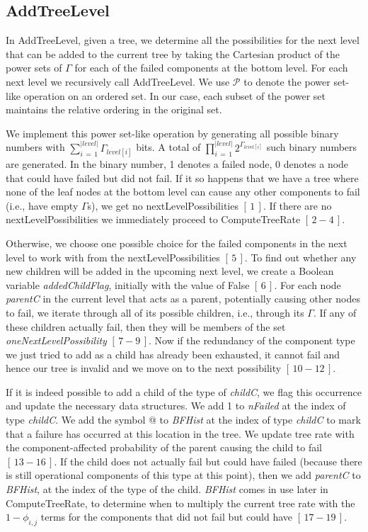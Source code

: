 \documentclass[12pt]{article}
\newcommand{\citeLine}[1]{$[\,#1\,]$}
\newcommand{\citeBlock}[2]{$[\,#1 - #2\,]$}
\begin{document}
\subsection{AddTreeLevel}

 In AddTreeLevel, given a tree, we determine all the possibilities for the next level that can be added to the current tree by taking the Cartesian product of the power sets of $\Gamma$ for each of the failed components at the bottom level. For each next level we recursively call AddTreeLevel. We use $\mathcal{P}$ to denote the power set-like operation on an ordered set. In our case, each subset of the power set maintains the relative ordering in the original set.

 We implement this power set-like operation by generating all possible binary numbers with $\sum\limits_{i\,=\,1}^{|level|}\Gamma_{level[i]}$ bits. A total of $\prod\limits_{i\,=\,1}^{|level|}2^{\Gamma_{level[i]}}$ such binary numbers are generated. In the binary number, 1 denotes a failed node, 0 denotes a node that could have failed but did not fail. If it so happens that we have a tree where none of the leaf nodes at the bottom level can cause any other components to fail (i.e., have empty $\Gamma$s), we get no nextLevelPossibilities \citeLine{1}. If there are no nextLevelPossibilities we immediately proceed to ComputeTreeRate \citeBlock{2}{4}.

 Otherwise, we choose one possible choice for the failed components in the next level to work with from the nextLevelPossibilities \citeLine{5}. To find out whether any new children will be added in the upcoming next level, we create a Boolean variable \textit{addedChildFlag}, initially with the value of False \citeLine{6}. For each node \textit{parentC} in the current level that acts as a parent, potentially causing other nodes to fail, we iterate through all of its possible children, i.e., through its $\Gamma$. If any of these children actually fail, then they will be members of the set \textit{oneNextLevelPossibility} \citeBlock{7}{9}. Now if the redundancy of the component type we just tried to add as a child has already been exhausted, it cannot fail and hence our tree is invalid and we move on to the next possibility \citeBlock{10}{12}.

 If it is indeed possible to add a child of the type of \textit{childC}, we flag this occurrence and update the necessary data structures. We add 1 to \textit{nFailed} at the index of type \textit{childC}. We add the symbol @ to \textit{BFHist} at the index of type \textit{childC} to mark that a failure has occurred at this location in the tree. We update tree rate with the component-affected probability of the parent causing the child to fail \citeBlock{13}{16}. If the child does not actually fail but could have failed (because there is still operational components of this type at this point), then we add \textit{parentC} to \textit{BFHist}, at the index of the type of the child. \textit{BFHist} comes in use later in ComputeTreeRate, to determine when to multiply the current tree rate with the $1-\phi_{i,j}$ terms for the components that did not fail but could have \citeBlock{17}{19}.
\end{document}
